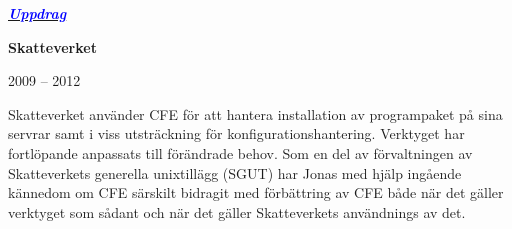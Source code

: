 \documentclass[11pt,a4paper,oneside]{article}
\begin{document}
{\fontsize{16pt}{24pt}\selectfont\textbf{\emph{\uline{\textcolor{blue}{Uppdrag}}}}}
\nopagebreak

\begin{minipage}[t]{5.5cm}
  {\fontsize{12pt}{14pt}\selectfont\textbf{Skatteverket}}
  
  2009 – 2012
\end{minipage}
\hspace{0.5cm}
\begin{minipage}[t]{9.8cm}
Skatteverket använder CFE för att hantera installation av programpaket
på sina servrar samt i viss utsträckning för konfigurationshantering.
Verktyget har fortlöpande anpassats till förändrade behov. Som en del
av förvaltningen av Skatteverkets generella unixtillägg (SGUT) har
Jonas med hjälp ingående kännedom om CFE särskilt bidragit med
förbättring av CFE både när det gäller verktyget som sådant och när
det gäller Skatteverkets användnings av det.
\end{minipage}
\end{document}
